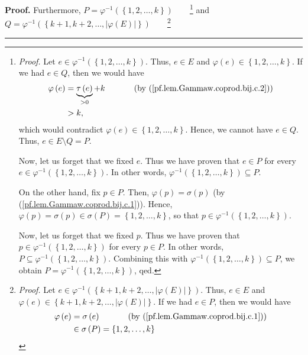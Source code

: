 \documentclass[numbers=enddot,12pt,final,onecolumn,notitlepage,abstracton]{scrartcl}
\theoremstyle{definition}
\newenvironment{proof}[1][Proof]{\noindent\textbf{#1.} }{\ \rule{0.5em}{0.5em}}
\newenvironment{verlong}{}{}
\begin{document}
\begin{verlong}
\begin{proof}
Furthermore, $P=\varphi^{-1}\left(  \left\{  1,2,\ldots,k\right\}  \right)
$\ \ \ \ \footnote{\textit{Proof.} Let $e\in\varphi^{-1}\left(  \left\{
1,2,\ldots,k\right\}  \right)  $. Thus, $e\in E$ and $\varphi\left(  e\right)
\in\left\{  1,2,\ldots,k\right\}  $. If we had $e\in Q$, then we would have
\begin{align*}
\varphi\left(  e\right)   &  =\underbrace{\tau\left(  e\right)  }%
_{>0}+k\ \ \ \ \ \ \ \ \ \ \left(  \text{by
(\ref{pf.lem.Gammaw.coprod.bij.c.2})}\right) \\
&  >k,
\end{align*}
which would contradict $\varphi\left(  e\right)  \in\left\{  1,2,\ldots
,k\right\}  $. Hence, we cannot have $e\in Q$. Thus, $e\in E\setminus Q=P$.
\par
Now, let us forget that we fixed $e$. Thus we have proven that $e\in P$ for
every $e\in\varphi^{-1}\left(  \left\{  1,2,\ldots,k\right\}  \right)  $. In
other words, $\varphi^{-1}\left(  \left\{  1,2,\ldots,k\right\}  \right)
\subseteq P$.
\par
On the other hand, fix $p\in P$. Then, $\varphi\left(  p\right)
=\sigma\left(  p\right)  $ (by (\ref{pf.lem.Gammaw.coprod.bij.c.1})). Hence,
$\varphi\left(  p\right)  =\sigma\left(  p\right)  \in\sigma\left(  P\right)
=\left\{  1,2,\ldots,k\right\}  $, so that $p\in\varphi^{-1}\left(  \left\{
1,2,\ldots,k\right\}  \right)  $.
\par
Now, let us forget that we fixed $p$. Thus we have proven that $p\in
\varphi^{-1}\left(  \left\{  1,2,\ldots,k\right\}  \right)  $ for every $p\in
P$. In other words, $P\subseteq\varphi^{-1}\left(  \left\{  1,2,\ldots
,k\right\}  \right)  $. Combining this with $\varphi^{-1}\left(  \left\{
1,2,\ldots,k\right\}  \right)  \subseteq P$, we obtain $P=\varphi^{-1}\left(
\left\{  1,2,\ldots,k\right\}  \right)  $, qed.} and $Q=\varphi^{-1}\left(
\left\{  k+1,k+2,\ldots,\left\vert \varphi\left(  E\right)  \right\vert
\right\}  \right)  $\ \ \ \ \footnote{\textit{Proof.} Let $e\in\varphi
^{-1}\left(  \left\{  k+1,k+2,\ldots,\left\vert \varphi\left(  E\right)
\right\vert \right\}  \right)  $. Thus, $e\in E$ and $\varphi\left(  e\right)
\in\left\{  k+1,k+2,\ldots,\left\vert \varphi\left(  E\right)  \right\vert
\right\}  $. If we had $e\in P$, then we would have
\begin{align*}
\varphi\left(  e\right)   &  =\sigma\left(  e\right)
\ \ \ \ \ \ \ \ \ \ \left(  \text{by (\ref{pf.lem.Gammaw.coprod.bij.c.1}%
)}\right) \\
&  \in\sigma\left(  P\right)  =\left\{  1,2,\ldots,k\right\}

\end{align*}}
\end{proof}
\end{verlong}
\end{document}
